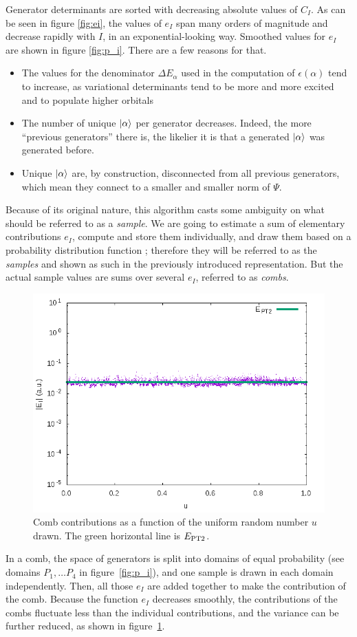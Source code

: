 \documentclass[./thesis.tex]{subfiles}
\begin{document}
Generator determinants are sorted with decreasing absolute values of $C_I$.
As can be seen in figure \ref{fig:ei}, the values of $e_I$ span many orders of magnitude and decrease rapidly with $I$, in an exponential-looking way. Smoothed values for $e_I$ are shown in figure \ref{fig:p_i}. There are a few reasons for that.
\begin{itemize}
	\item
	The values for the denominator $\Delta E_\alpha$ used in the computation of $\epsilon(\alpha)$ tend to increase, as variational determinants tend to be more and more excited and to populate higher orbitals 
	\item
	The number of unique $\ket \alpha$ per generator decreases. Indeed, the more ``previous generators'' there is, the likelier it is that a generated $\ket \alpha$ was generated before.
	\item
	Unique $\ket \alpha$ are, by construction, disconnected from all previous generators, which mean they connect to a smaller and smaller norm of $\Psi$.
\end{itemize}


Because of its original nature, this algorithm casts some ambiguity on what should be referred to as a \emph{sample}. We are going to estimate a sum of elementary contributions $e_I$, compute and store them individually, and draw them based on a probability distribution function ; therefore they will be referred to as the \emph{samples} and shown as such in the previously introduced representation. But the actual sample values are sums over several $e_I$, referred to as \emph{combs}.

\begin{figure}[h!]
	\begin{center}
		\includegraphics[width=0.7\columnwidth]{figures/pt2/comb_variance}
	\end{center}
		\caption{Comb contributions as a function of the uniform random number $u$ drawn. The green horizontal line is $E_\text{PT2}$.}
		\label{fig:ei_comb}
\end{figure}
In a comb, the space of generators is split into domains of equal probability (see
domains $P_1, \dots P_4$ in figure~\ref{fig:p_i}), and
one sample is drawn in each domain independently. Then, all those $e_I$ are added together to make the contribution of the comb. Because the function $e_I$ decreases smoothly, the contributions of the combs fluctuate less than the individual contributions, and the variance can be further reduced, as shown in figure~\ref{fig:ei_comb}.
\end{document}
